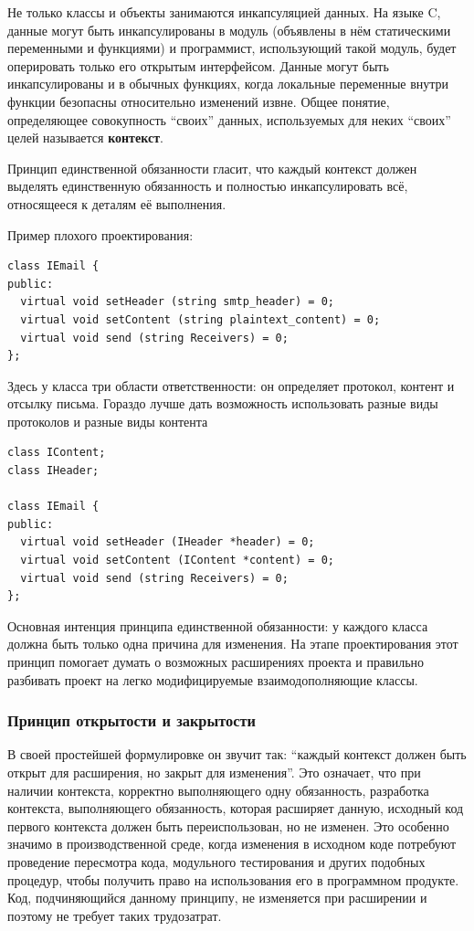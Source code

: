 \documentclass[a4paper,12pt,oneside]{article}
\begin{document}
Не только классы и объекты занимаются инкапсуляцией данных. На языке C, данные могут быть инкапсулированы в модуль (объявлены в нём статическими переменными и функциями) и программист, использующий такой модуль, будет оперировать только его открытым интерфейсом. Данные могут быть инкапсулированы и в обычных функциях, когда локальные переменные внутри функции безопасны относительно изменений извне. Общее понятие, определяющее совокупность ``своих'' данных, используемых для неких ``своих'' целей называется \textbf{контекст}.

Принцип единственной обязанности гласит, что каждый контекст должен выделять единственную обязанность и полностью инкапсулировать всё, относящееся к деталям её выполнения.

Пример плохого проектирования:

\begin{lstlisting}
class IEmail {
public:
  virtual void setHeader (string smtp_header) = 0;
  virtual void setContent (string plaintext_content) = 0;
  virtual void send (string Receivers) = 0;
};
\end{lstlisting}

Здесь у класса три области ответственности: он определяет протокол, контент и отсылку письма. Гораздо лучше дать возможность использовать разные виды протоколов и разные виды контента

\begin{lstlisting}
class IContent;
class IHeader;

class IEmail {
public:
  virtual void setHeader (IHeader *header) = 0;
  virtual void setContent (IContent *content) = 0;
  virtual void send (string Receivers) = 0;
};
\end{lstlisting}

Основная интенция принципа единственной обязанности: у каждого класса должна быть только одна причина для изменения. На этапе проектирования этот принцип помогает думать о возможных расширениях проекта и правильно разбивать проект на легко модифицируемые взаимодополняющие классы.

\subsubsection{Принцип открытости и закрытости}\label{OCP}

В своей простейшей формулировке он звучит так: ``каждый контекст должен быть открыт для расширения, но закрыт для изменения''. Это означает, что при наличии контекста, корректно выполняющего одну обязанность, разработка контекста, выполняющего обязанность, которая расширяет данную, исходный код первого контекста должен быть переиспользован, но не изменен. Это особенно значимо в производственной среде, когда изменения в исходном коде потребуют проведение пересмотра кода, модульного тестирования и других подобных процедур, чтобы получить право на использования его в программном продукте. Код, подчиняющийся данному принципу, не изменяется при расширении и поэтому не требует таких трудозатрат.
\end{document}
